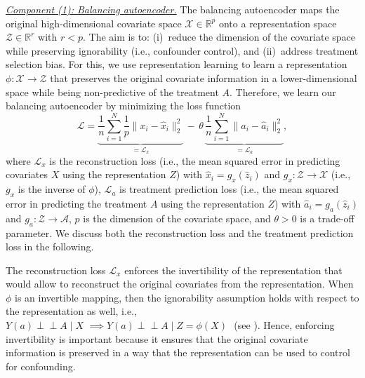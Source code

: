 \documentclass[sigconf]{acmart}
\begin{document}
\noindent
\underline{\emph{Component (1): Balancing autoencoder.}} The balancing autoencoder maps the original high-dimensional covariate space $\mathcal{X} \in \mathbb{R}^p$ onto a representation space $ \mathcal{Z} \in \mathbb{R}^r$ with $r < p$. The aim is to: (i)~reduce the dimension of the covariate space while preserving ignorability (i.e., confounder control), and (ii)~address treatment selection bias. For this, we use representation learning \cite{Bengio2013} to learn a representation $\phi: \mathcal{X} \rightarrow  \mathcal{Z}$  that preserves the original covariate information in a lower-dimensional space while being non-predictive of the treatment $A$. Therefore, we learn our balancing autoencoder by minimizing the loss function 
\begin{equation}
\label{eq:loss_bae}
\mathcal{L} = \underbrace{\frac{1}{n}  \sum_{i=1}^N \frac{1}{p} \big\| x_i - \hat{x}_i {\big\|}_2^2}_{ = \mathcal{L}_x} \, - \, \theta \, \underbrace{\frac{1}{n}  \sum_{i=1}^N \big\| a_i - \hat{a}_i {\big\|}_2^2}_{ = \mathcal{L}_a},
\end{equation}
where $\mathcal{L}_x$ is the reconstruction loss (i.e., the mean squared error in predicting covariates $X$ using the representation $Z$) with $\hat{x}_i = g_x(\hat{z}_i)$ and $g_x: \mathcal{Z} \rightarrow \mathcal{X}$ (i.e., $g_x$ is the inverse of $\phi$), $ \mathcal{L}_a$ is treatment prediction loss (i.e., the mean squared error in predicting the treatment $A$ using the representation $Z$) with $\hat{a}_i = g_a(\hat{z}_i)$ and $g_a: \mathcal{Z} \rightarrow \mathcal{A}$, $p$ is the dimension of the covariate space, and $\theta > 0$ is a trade-off parameter. We discuss both the reconstruction loss and the treatment prediction loss in the following. 

The reconstruction loss $\mathcal{L}_x$ enforces the invertibility of the representation that would allow to reconstruct the original covariates from the representation. When $\phi$ is an invertible mapping, then the ignorability assumption holds with respect to the representation as well, i.e., $Y(a) \perp \!\!\! \perp A \mid X \, \, \implies Y(a) \perp \!\!\! \perp A \mid Z = \phi(X) \, \, $ (see \cite{Zhang2020}). Hence, enforcing invertibility is important because it ensures that the original covariate information is preserved in a way that the representation can be used to control for confounding.
\end{document}
